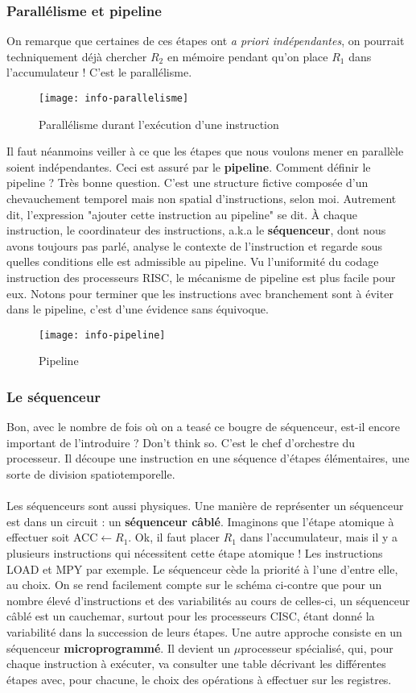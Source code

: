 \documentclass[12pt,a4paper]{report}
\begin{document}
\subsubsection{Parallélisme et pipeline}
On remarque que certaines de ces étapes ont \textit{a priori indépendantes}, on pourrait techniquement déjà chercher $R_2$ en mémoire pendant qu'on place $R_1$ dans l'accumulateur ! C'est le parallélisme. 
\begin{figure}[h!]
\centering
\texttt{[image: info-parallelisme]}
\caption{Parallélisme durant l'exécution d'une instruction}
\label{fig:parallelisme}
\end{figure}
Il faut néanmoins veiller à ce que les étapes que nous voulons mener en parallèle soient indépendantes. Ceci est assuré par le \textbf{pipeline}. Comment définir le pipeline ? Très bonne question. C'est une structure fictive composée d'un chevauchement temporel mais non spatial d'instructions, selon moi. Autrement dit, l'expression "ajouter cette instruction au pipeline" se dit. À chaque instruction, le coordinateur des instructions, a.k.a le \textbf{séquenceur}, dont nous avons toujours pas parlé, analyse le contexte de l'instruction et regarde sous quelles conditions elle est admissible au pipeline. Vu l'uniformité du codage instruction des processeurs RISC, le mécanisme de pipeline est plus facile pour eux. Notons pour terminer que les instructions avec branchement sont à éviter dans le pipeline, c'est d'une évidence sans équivoque.
\begin{figure}[h!]
\centering
\texttt{[image: info-pipeline]}
\caption{Pipeline}
\label{fig:pipeline}
\end{figure}
\subsubsection{Le séquenceur}
Bon, avec le nombre de fois où on a teasé ce bougre de séquenceur, est-il encore important de l'introduire ? Don't think so. C'est le chef d'orchestre du processeur. Il découpe une instruction en une séquence d'étapes élémentaires, une sorte de division spatiotemporelle.\\
\\
Les séquenceurs sont aussi physiques. Une manière de représenter un séquenceur est dans un circuit : un \textbf{séquenceur câblé}. Imaginons que l'étape atomique à effectuer soit ACC$\leftarrow R_1$. Ok, il faut placer $R_1$ dans l'accumulateur, mais il y a plusieurs instructions qui nécessitent cette étape atomique ! Les instructions LOAD et MPY par exemple. Le séquenceur cède la priorité à l'une d'entre elle, au choix. On se rend facilement compte sur le schéma ci-contre que pour un nombre élevé d'instructions et des variabilités au cours de celles-ci, un séquenceur câblé est un cauchemar, surtout pour les processeurs CISC, étant donné la variabilité dans la succession de leurs étapes. Une autre approche consiste en un séquenceur \textbf{microprogrammé}. Il devient un $\mu$processeur spécialisé, qui, pour chaque instruction à exécuter, va consulter une table décrivant les différentes étapes avec, pour chacune, le choix des opérations à effectuer sur les registres.
\end{document}
